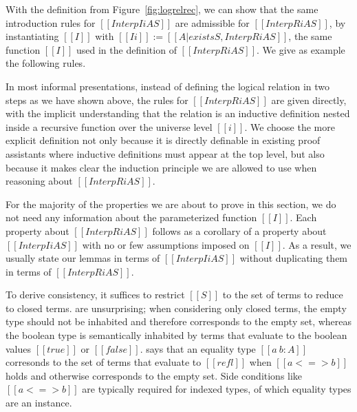 \documentclass[acmsmall]{acmart}
\begin{document}
With the definition from Figure~\ref{fig:logrelrec}, we can
show that the same introduction rules for $[[Interp I i A S]]$ are
admissible for $[[InterpR i A S]]$, by
instantiating $[[I]]$ with $[[I i]] := [[{A | exists S , InterpR i A
  S}]]$, the same function $[[I]]$ used in the definition of $[[InterpR i A
S]]$. We give as example the following rules.
\begin{center}
 \qquad {}
\end{center}

In most informal presentations, instead of defining the logical
relation in two steps as we have shown above, the rules for $[[InterpR
i A S]]$ are given directly, with the implicit understanding that the
relation is an inductive definition nested inside a recursive
function over the universe level $[[i]]$. We choose
the more explicit definition not only because it is directly definable
in existing proof assistants where inductive definitions must appear
at the top level, but also because it makes clear the induction
principle we are allowed to use when reasoning about $[[InterpR i A
S]]$.



For the majority of the properties we are about to prove in this section, we
do not need any information about the parameterized function $[[I]]$.
Each property about $[[InterpR i A S]]$ follows as a corollary of
a property about $[[Interp I i A S]]$ with no or few assumptions imposed on
$[[I]]$. As a result, we usually state our lemmas in terms of
$[[Interp I i A S]]$ without duplicating them in terms of $[[InterpR i
A S]]$.

To derive consistency, it suffices to restrict $[[S]]$ to the set of
terms to reduce to closed terms.  are
unsurprising; when considering only closed terms, the empty type
should not be inhabited and therefore corresponds to the empty set,
whereas the boolean type is semantically inhabited by terms that
evaluate to the boolean values $[[true]]$ or $[[false]]$. 
says that an equality type $[[a ~ b : A]]$ corresonds to the
set of terms that evaluate to $[[refl]]$ when $[[a <=> b]]$ holds and
otherwise corresponds to the empty set. Side conditions like $[[a <=>
b]]$ are typically required for indexed types, of which equality types
are an instance.
\end{document}
